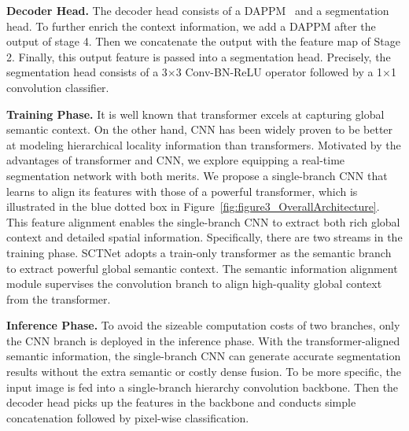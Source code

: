 \documentclass[letterpaper]{article} %
\begin{document}
\noindent
{\bf Decoder Head.} The decoder head consists of a DAPPM~\cite{pan2022deep} and a segmentation head. To further enrich the context information, we add a DAPPM after the output of stage 4. Then we concatenate the output with the feature map of Stage 2. Finally, this output feature is passed into a segmentation head. Precisely, the segmentation head consists of a 3$\times$3 Conv-BN-ReLU operator followed by a 1$\times$1 convolution classifier.

\noindent
{\bf Training Phase.}
It is well known that transformer excels at capturing global semantic context. On the other hand, CNN has been widely proven to be better at modeling hierarchical locality information than transformers. Motivated by the advantages of transformer and CNN, we explore equipping a real-time segmentation network with both merits. We propose a single-branch CNN that learns to align its features with those of a powerful transformer, which is illustrated in the blue dotted box in Figure~\ref{fig:figure3_OverallArchitecture}. This feature alignment enables the single-branch CNN to extract both rich global context and detailed spatial information. Specifically, there are two streams in the training phase. SCTNet adopts a train-only transformer as the semantic branch to extract powerful global semantic context. The semantic information alignment module supervises the convolution branch to align high-quality global context from the transformer.

\noindent
{\bf Inference Phase.}
To avoid the sizeable computation costs of two branches, only the CNN branch is deployed in the inference phase. With the transformer-aligned semantic information, the single-branch CNN can generate accurate segmentation results without the extra semantic or costly dense fusion. To be more specific, the input image is fed into a single-branch hierarchy convolution backbone. Then the decoder head picks up the features in the backbone and conducts simple concatenation followed by pixel-wise classification.

\noindent
\end{document}
